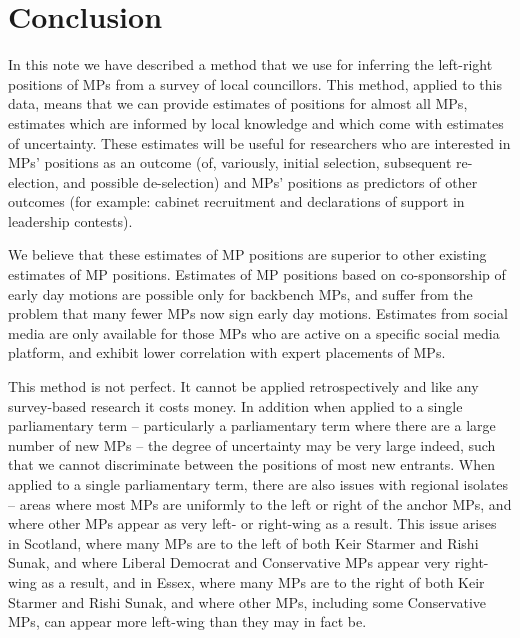 \documentclass[
]{article}
\begin{document}
\section{Conclusion}\label{conclusion}

In this note we have described a method that we use for inferring the
left-right positions of MPs from a survey of local councillors. This
method, applied to this data, means that we can provide estimates of
positions for almost all MPs, estimates which are informed by local
knowledge and which come with estimates of uncertainty. These estimates
will be useful for researchers who are interested in MPs' positions as
an outcome (of, variously, initial selection, subsequent re-election,
and possible de-selection) and MPs' positions as predictors of other
outcomes (for example: cabinet recruitment and declarations of support
in leadership contests).

We believe that these estimates of MP positions are superior to other
existing estimates of MP positions. Estimates of MP positions based on
co-sponsorship of early day motions are possible only for backbench MPs,
and suffer from the problem that many fewer MPs now sign early day
motions. Estimates from social media are only available for those MPs
who are active on a specific social media platform, and exhibit lower
correlation with expert placements of MPs.

This method is not perfect. It cannot be applied retrospectively and
like any survey-based research it costs money. In addition when applied
to a single parliamentary term -- particularly a parliamentary term
where there are a large number of new MPs -- the degree of uncertainty
may be very large indeed, such that we cannot discriminate between the
positions of most new entrants. When applied to a single parliamentary
term, there are also issues with regional isolates -- areas where most
MPs are uniformly to the left or right of the anchor MPs, and where
other MPs appear as very left- or right-wing as a result. This issue
arises in Scotland, where many MPs are to the left of both Keir Starmer
and Rishi Sunak, and where Liberal Democrat and Conservative MPs appear
very right-wing as a result, and in Essex, where many MPs are to the
right of both Keir Starmer and Rishi Sunak, and where other MPs,
including some Conservative MPs, can appear more left-wing than they may
in fact be.
\end{document}
